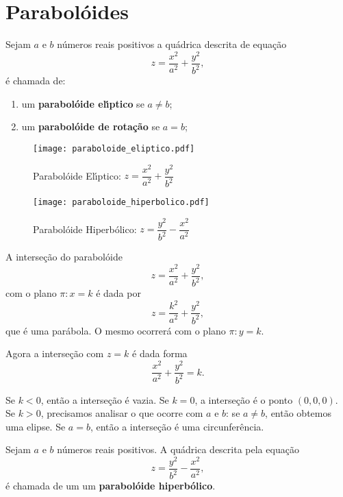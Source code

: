 \section{Parabol\'oides} %
\label{sec:paraboloide}
\begin{definicao}
	Sejam $a$ e $b$ n\'umeros reais positivos a qu\'adrica descrita de equa\c{c}\~ao
	\[
		z = \dfrac{x^2}{a^2} + \dfrac{y^2}{b^2},
	\]
	\'e chamada de:
	\begin{enumerate}
		\item um \textbf{parabol\'oide el{\'\i}ptico} se $a \ne b$;
		\item um \textbf{parabol\'oide de rota\c{c}\~ao} se $a = b$;
	\end{enumerate}
\end{definicao}

\begin{figure}[!h]
	\centering
	\caption{Parabol\'oide El{\'\i}ptico: $z = \dfrac{x^2}{a^2} + \dfrac{y^2}{b^2}$}
	\texttt{[image: paraboloide\_eliptico.pdf]}
\end{figure}

\begin{figure}[!h]
	\centering
	\caption{Parabol\'oide Hiperb\'olico: $z = \dfrac{y^2}{b^2} - \dfrac{x^2}{a^2}$}
	\texttt{[image: paraboloide\_hiperbolico.pdf]}
\end{figure}

A interse\c{c}\~ao do parabol\'oide
\[
	z = \dfrac{x^2}{a^2} + \dfrac{y^2}{b^2},
\]
com o plano $\pi: x = k$ \'e dada por
\[
	z = \dfrac{k^2}{a^2} + \dfrac{y^2}{b^2},
\]
que \'e uma par\'abola. O mesmo ocorrer\'a com o plano $\pi: y = k$.

Agora a interse\c{c}\~ao com $z = k$ \'e dada forma
\[
	\dfrac{x^2}{a^2} + \dfrac{y^2}{b^2} = k.
\]

Se $k < 0$, ent\~ao a interse\c{c}\~ao \'e vazia. Se $k = 0$, a interse\c{c}\~ao \'e o ponto $(0,0,0)$. Se $k > 0$, precisamos analisar o que ocorre com $a$ e $b$: se $a \ne b$, ent\~ao obtemos uma elipse. Se $a = b$, ent\~ao a interse\c{c}\~ao \'e uma circunfer\^encia.

\begin{definicao}
	Sejam $a$ e $b$ n\'umeros reais positivos. A qu\'adrica descrita pela equa\c{c}\~ao
	\[
		z = \dfrac{y^2}{b^2} - \dfrac{x^2}{a^2},
	\]
	\'e chamada de um um \textbf{parabol\'oide hiperb\'olico}.
\end{definicao}

